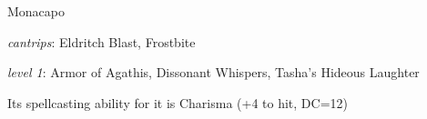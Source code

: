 \documentclass[10pt,twoside, twocolumn, openany]{dndbook}
\begin{document}
\begin{monsterbox}{Monacapo}
\begin{monsteraction}[Spellcasting]
    \textit{cantrips}: Eldritch Blast, Frostbite
    
    \textit{level 1}: Armor of Agathis, Dissonant Whispers, Tasha's Hideous Laughter

    Its spellcasting ability for it is Charisma (+4 to hit, DC=12)
  \end{monsteraction}

  \monstermelee[
    name=Summoned Longsword,
    mod=+4,
    reach=5,
    targets=one target,
    dmg=\dice{1d8+2},
    dmgtype=slashing,
    ordmg=\dice{1d10+2},
    ordmgwhen=if used with two hands
  ]

\end{monsterbox}
\end{document}
